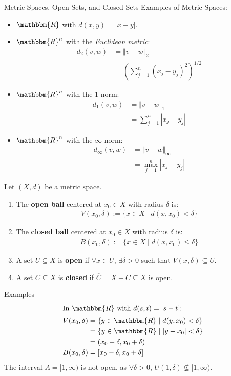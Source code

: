 \documentclass[10pt]{extarticle}
\newcommand{\R}{\mathbbm{R}}
\begin{document}
  \begin{problem}{Metric Spaces, Open Sets, and Closed Sets}
    Examples of Metric Spaces:
    \begin{itemize}
      \item $\R$ with $d(x,y) = |x-y|$.
      \item $\R^n$ with the \textsl{Euclidean metric}:
        \begin{align*}
          d_2(v,w) &= \Vert v - w \Vert_2\\
                   &= \left(\sum_{j=1}^{n}(x_j-y_j)^2\right)^{1/2}
        \end{align*}
      \item $\R^n$ with the $1$-norm:
        \begin{align*}
          d_1(v,w) &= \Vert v-w\Vert_1\\
                   &= \sum_{j=1}^{n} |x_j-y_j|
        \end{align*}
      \item $\R^n$ with the $\infty$-norm:
        \begin{align*}
          d_{\infty}(v,w) &= \Vert v-w\Vert_{\infty}\\
                          &= \max_{j=1}^{n} |x_j-y_j|
        \end{align*}
    \end{itemize}
    Let $(X,d)$ be a metric space.
    \begin{enumerate}[(1)]
      \item The \textbf{open ball} centered at $x_0\in X$ with radius $\delta$ is:
        \begin{align*}
        V(x_0,\delta) := \{x\in X \mid d(x,x_0) < \delta\}
        \end{align*}
      \item The \textbf{closed ball} centered at $x_0\in X$  with radius $\delta$ is:
        \begin{align*}
          B(x_0,\delta) := \{x\in X \mid d(x,x_0) \leq \delta\}
        \end{align*}
      \item A set $U\subseteq X$ is \textbf{open} if $\forall x\in U$, $\exists \delta > 0$ such that $V(x,\delta)\subseteq U$.
      \item A set $C\subseteq X$ is \textbf{closed} if $\overline{C} = X-C\subseteq X$ is open.
    \end{enumerate}
    \begin{problem}{Examples}
      \begin{align*}
        \shortintertext{In $\R$ with $d(s,t) = |s-t|$:}
        V(x_0,\delta) &= \{y\in\R \mid d(y,x_0) < \delta\}\\
                      &= \{y\in\R \mid |y-x_0| < \delta\}\\
                      &= (x_0-\delta,x_0+\delta)\\
        B(x_0,\delta) &= [x_0-\delta,x_0+\delta]
      \end{align*}
      The interval $A = [1,\infty)$ is not open, as $\forall \delta > 0$, $U(1,\delta)\not\subseteq [1,\infty)$.\\


\end{problem}
\end{problem}
\end{document}
